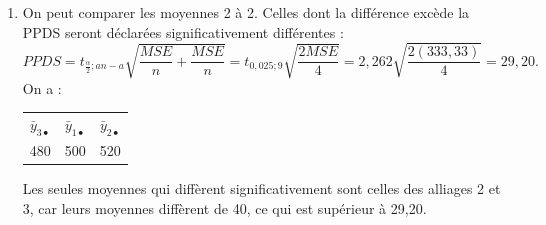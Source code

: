 \begin{exercice}
\begin{solution}
\begin{enumerate}[label=(\alph*)]
  \emph{Décision :} puisque $f_{obs}=4,8$ est supérieur à 4,26, alors on rejette $H_0$.

  \emph{Conclusion :} au moins 2 alliages diffèrent de façon significative. Le type
  d'alliage a un effet significatif sur la torsion moyenne.
  \item On peut comparer les moyennes 2 à 2. Celles dont la différence excède la PPDS seront
  déclarées significativement différentes :
  \[
    PPDS=t_{\frac{\alpha}{2};an-a}\sqrt{\frac{MSE}{n}+\frac{MSE}{n}}
    =t_{0,025;9}\sqrt{\frac{2MSE}{4}}=2,262\sqrt{\frac{2(333,33)}{4}}=29,20.
  \]
  On a :
  \begin{center}
  \begin{tabular}{ccc}
    $\bar y_{3\bullet}$ & $\bar y_{1\bullet}$ & $\bar y_{2\bullet}$\\
    480 & 500 & 520\\
  \end{tabular}
  \end{center}
  Les seules moyennes qui diffèrent significativement sont celles des alliages 2 et 3, car
  leurs moyennes diffèrent de 40, ce qui est supérieur à 29,20.
\end{enumerate}
\end{solution}
\end{exercice}

